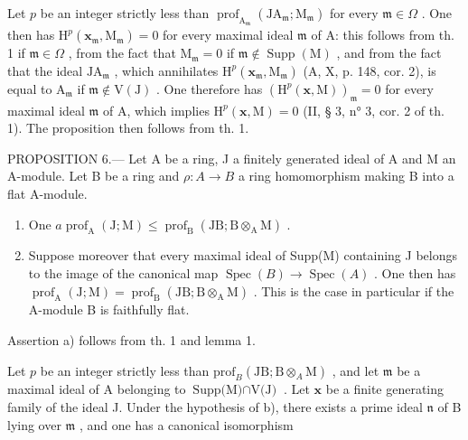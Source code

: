 Let \(p\) be an integer strictly less than \(\operatorname{prof}_{\mathrm{A}_{\mathfrak{m}}}\left(\mathrm{JA}_{\mathfrak{m}};\mathrm{M}_{\mathfrak{m}}\right)\) for every \(\mathfrak{m}\in\Omega\) . One then has \(\mathrm{H}^{p}\left(\mathbf{x}_{\mathfrak{m}},\mathrm{M}_{\mathfrak{m}}\right)=0\) for every maximal ideal \(\mathfrak{m}\) of A: this follows from th. 1 if \(\mathfrak{m}\in\Omega\) , from the fact that \(\mathrm{M}_{\mathfrak{m}}=0\) if \(\mathfrak{m}\notin\operatorname{Supp}(\mathrm{M})\) , and from the fact that the ideal \(\mathrm{JA}_{\mathfrak{m}}\) , which annihilates \(\mathrm{H}^{p}\left(\mathbf{x}_{\mathfrak{m}},\mathrm{M}_{\mathfrak{m}}\right)\) (A, X, p. 148, cor. 2), is equal to \(\mathrm{A}_{\mathfrak{m}}\) if \(\mathfrak{m}\notin\mathrm{V}(\mathrm{J})\) . One therefore has \(\left(\mathrm{H}^{p}(\mathbf{x},\mathrm{M})\right)_{\mathfrak{m}}=0\) for every maximal ideal \(\mathfrak{m}\) of A, which implies \(\mathrm{H}^{p}(\mathbf{x},\mathrm{M})=0\) (II, § 3, n° 3, cor. 2 of th. 1). The proposition then follows from th. 1.

PROPOSITION 6.--- Let A be a ring, J a finitely generated ideal of A and M an A-module. Let B be a ring and \(\rho: A \to B\) a ring homomorphism making B into a flat A-module.

\begin{enumerate}
\def\labelenumi{\alph{enumi})}
\item
  One \(a \operatorname{prof}_{\mathrm{A}}(\mathrm{J}; \mathrm{M}) \leqslant \operatorname{prof}_{\mathrm{B}}(\mathrm{JB}; \mathrm{B} \otimes_{\mathrm{A}} \mathrm{M})\) .
\item
  Suppose moreover that every maximal ideal of Supp(M) containing J belongs to the image of the canonical map \(\operatorname{Spec}(B) \to \operatorname{Spec}(A)\) . One then has \(\operatorname{prof}_{\mathrm{A}}(\mathrm{J}; \mathrm{M}) = \operatorname{prof}_{\mathrm{B}}(\mathrm{JB}; \mathrm{B} \otimes_{\mathrm{A}} \mathrm{M})\) . This is the case in particular if the A-module B is faithfully flat.
\end{enumerate}

Assertion a) follows from th. 1 and lemma 1.

Let \(p\) be an integer strictly less than \(\text{prof}_B(\text{JB};\text{B} \otimes_A \text{M})\) , and let \(\mathfrak{m}\) be a maximal ideal of A belonging to \(\text{Supp(M)} \cap \text{V(J)}\) . Let \(\mathbf{x}\) be a finite generating family of the ideal J. Under the hypothesis of b), there exists a prime ideal \(\mathfrak{n}\) of B lying over \(\mathfrak{m}\) , and one has a canonical isomorphism

